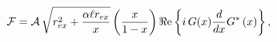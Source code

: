 \begin{equation}
\mathcal{F}={\cal A}\,\sqrt{r_{ex}^2+\frac{\alpha\ell
r_{ex}}{x}}\left( \frac{x}{1-x}\right) \Re
\mbox{e}\left\{i\,G(x)
\frac{d}{dx}G^{*}\left(x\right)\right\},
\end{equation}

